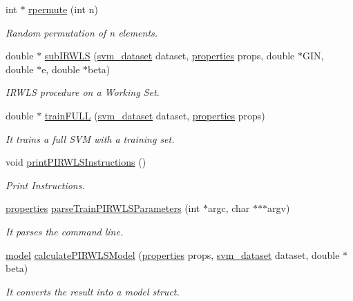 \begin{DoxyCompactItemize}
\item 
int $\ast$ \hyperlink{PIRWLS-train_8h_a9e75aabe599f48c66cbda89320d68a71}{rpermute} (int n)
\begin{DoxyCompactList}\small\item\em Random permutation of n elements. \end{DoxyCompactList}\item 
double $\ast$ \hyperlink{PIRWLS-train_8h_af736cb71af5e7e4cb062977793905f4d}{sub\+I\+R\+W\+LS} (\hyperlink{structsvm__dataset}{svm\+\_\+dataset} dataset, \hyperlink{structproperties}{properties} props, double $\ast$G\+IN, double $\ast$e, double $\ast$beta)
\begin{DoxyCompactList}\small\item\em I\+R\+W\+LS procedure on a Working Set. \end{DoxyCompactList}\item 
double $\ast$ \hyperlink{PIRWLS-train_8h_ad719770a7de382211555ba831af2ea28}{train\+F\+U\+LL} (\hyperlink{structsvm__dataset}{svm\+\_\+dataset} dataset, \hyperlink{structproperties}{properties} props)
\begin{DoxyCompactList}\small\item\em It trains a full S\+VM with a training set. \end{DoxyCompactList}\item 
void \hyperlink{PIRWLS-train_8h_ac4a62e1a98c35f9d7e8996d58fe48523}{print\+P\+I\+R\+W\+L\+S\+Instructions} ()
\begin{DoxyCompactList}\small\item\em Print Instructions. \end{DoxyCompactList}\item 
\hyperlink{structproperties}{properties} \hyperlink{PIRWLS-train_8h_a661bbe4aa2899bb306b7b509296068a2}{parse\+Train\+P\+I\+R\+W\+L\+S\+Parameters} (int $\ast$argc, char $\ast$$\ast$$\ast$argv)
\begin{DoxyCompactList}\small\item\em It parses the command line. \end{DoxyCompactList}\item 
\hyperlink{structmodel}{model} \hyperlink{PIRWLS-train_8h_aeaa2f3c1d0f757826017dae7a83d7f8a}{calculate\+P\+I\+R\+W\+L\+S\+Model} (\hyperlink{structproperties}{properties} props, \hyperlink{structsvm__dataset}{svm\+\_\+dataset} dataset, double $\ast$beta)
\begin{DoxyCompactList}\small\item\em It converts the result into a model struct. \end{DoxyCompactList}\end{DoxyCompactItemize}


